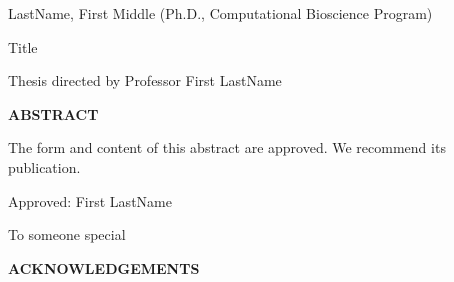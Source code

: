 \documentclass[12pt]{caltech_thesis}
\begin{document}
\newpage
\begin{flushleft}
LastName, First Middle (Ph.D., Computational Bioscience Program)

Title

Thesis directed by Professor First LastName
\end{flushleft}
\vspace{-2em}
\begin{center}\textbf{ABSTRACT}\end{center}
\vspace{-2em}
\begin{flushleft}

\lipsum[1]

\lipsum[2]

\lipsum[3]
\end{flushleft}



\begin{flushright}
The form and content of this abstract are approved. We recommend its publication.\par

Approved: First LastName %
\end{flushright}


\newpage
\begin{vplace}[0.7]
\begin{flushleft}


To someone special \\


\end{flushleft}
\end{vplace}

\newpage
\begin{center}\textbf{ACKNOWLEDGEMENTS}\end{center}
\lipsum[1]
\lipsum[2]
\lipsum[7]

\begin{KeepFromToc}
  \tableofcontents
  \listoftables
  \listoffigures
\end{KeepFromToc}

\printnomenclature

\mainmatter
\raggedright
\setlength\parindent{.5in}
\end{document}
